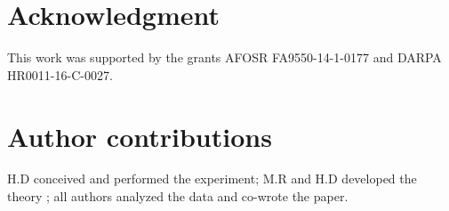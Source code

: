 \documentclass[%
 reprint,
 amsmath,amssymb,
 aps
]{revtex4-1}
\begin{document}
\section*{Acknowledgment}
This work was supported by the grants AFOSR FA9550-14-1-0177 and DARPA HR0011-16-C-0027.

\section*{Author contributions}
H.D conceived and performed the experiment; M.R and H.D developed the theory ; all authors analyzed the data and co-wrote the paper.

\nocite{reichert_optimizing_2018,fedorov_gaussian_2009,moreau_realization_2012,tasca_imaging_2012,howell_realization_2004,small_looking_2012,feng_correlations_1988}


%
\end{document}

